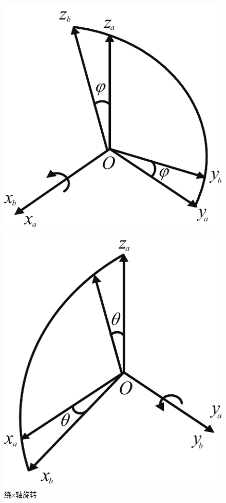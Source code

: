 \begin{figure}[!htb]
	\begin{minipage}{0.34\linewidth}
		\centering
		\includegraphics[width=0.77\linewidth]{pic/x}
		\vspace*{-0.5em}
		\caption{绕$x$轴旋转}
		\label{x}
	\end{minipage}
	\begin{minipage}{0.3\linewidth}
		\centering
		\includegraphics[width=0.78\linewidth]{pic/y}
		\vspace*{-0.5em}

\end{minipage}
\end{figure}
